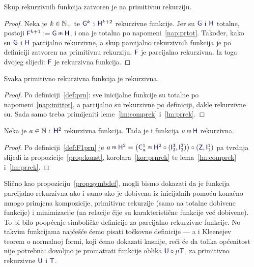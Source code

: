 \begin{lema}[{name=[zatvorenost skupa rekurzivnih funkcija na primitivnu rekurziju]}]\label{lm:prrek}
Skup rekurzivnih funkcija zatvoren je na primitivnu rekurziju.
\end{lema}
\begin{proof}
    Neka je $k\in{\mathbb N}_+$ te $\f G^k$ i $\f H^{k+2}$ rekurzivne funkcije. Jer su $\f G$ i $\f H$ totalne, postoji $\f F^{k+1}:=\f G\pr\f H$, i ona je totalna po napomeni~\ref{nap:prtot}. Također, kako su $\f G$ i $\f H$ parcijalno rekurzivne, a skup parcijalno rekurzivnih funkcija je po definiciji zatvoren na primitivnu rekurziju, $\f F$ je parcijalno rekurzivna. Iz toga dvojeg slijedi: $\f F$ je rekurzivna funkcija.
\end{proof}

\begin{korolar}[{name=[rekurzivnost primitivno rekurzivnih funkcija]}]\label{kor:prnrek}
Svaka primitivno rekurzivna funkcija je rekurzivna.
\end{korolar}
\begin{proof}
    Po definiciji~\ref{def:prn}: sve inicijalne funkcije su totalne po napomeni~\ref{nap:inittot}, a parcijalno su rekurzivne po definiciji, dakle rekurzivne su.
	Sada samo treba primijeniti leme~\ref{lm:comprek} i~\ref{lm:prrek}.
\end{proof}

\begin{korolar}[{name=[degenerirana primitivna rekurzija iz rekurzivne funkcije]}]\label{kor:F1rek}
Neka je $a\in{\mathbb N}$ i $\f H^2$ rekurzivna funkcija. Tada je i funkcija $a\pr\f H$ rekurzivna.
\end{korolar}
\begin{proof}
	Po definiciji~\ref{def:F1prn} je $a\pr\f H^2=\bigl(\f C_a^1\pr\f H^2\circ(\f I_2^3,\f I_3^3)\bigr)\circ(\f Z,\f I_1^1)$ pa tvrdnja slijedi iz propozicije~\ref{prop:konst}, korolara~\ref{kor:prnrek} te lema~\ref{lm:comprek} i~\ref{lm:prrek}.
\end{proof}

Slično kao propoziciju~\ref{prop:symbdef}, mogli bismo dokazati da je funkcija parcijalno rekurzivna ako i samo ako je dobivena iz inicijalnih pomoću konačno mnogo primjena kompozicije, primitivne rekurzije (samo na totalne dobivene funkcije) i minimizacije (na relacije čije su karakteristične funkcije već dobivene). To bi bilo poopćenje simboličke definicije za parcijalno rekurzivne funkcije. No takvim funkcijama najčešće ćemo pisati točkovne definicije --- a i Kleenejev teorem o normalnoj formi, koji ćemo dokazati kasnije, reći će da tolika općenitost nije potrebna: dovoljno je promatrati funkcije oblika $\f U\circ\mu\f T$, za primitivno rekurzivne $\f U$ i $\f T$.

